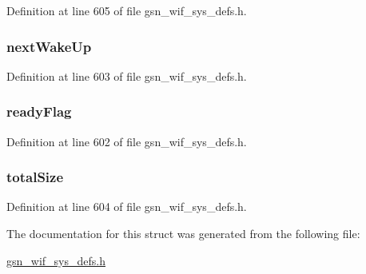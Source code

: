 Definition at line 605 of file gsn\_\-wif\_\-sys\_\-defs.h.

\hypertarget{a00363_a760a4ce0d264283e270a3dec2c784fd9}{
\subsubsection[{nextWakeUp}]{ {\bf nextWakeUp}}}
\label{a00363_a760a4ce0d264283e270a3dec2c784fd9}


Definition at line 603 of file gsn\_\-wif\_\-sys\_\-defs.h.

\hypertarget{a00363_a124b70eb42eacdeecd82e36e46b93d59}{
\subsubsection[{readyFlag}]{ {\bf readyFlag}}}
\label{a00363_a124b70eb42eacdeecd82e36e46b93d59}


Definition at line 602 of file gsn\_\-wif\_\-sys\_\-defs.h.

\hypertarget{a00363_a525677d0cc8dc888ce314ff840778c74}{
\subsubsection[{totalSize}]{ {\bf totalSize}}}
\label{a00363_a525677d0cc8dc888ce314ff840778c74}


Definition at line 604 of file gsn\_\-wif\_\-sys\_\-defs.h.



The documentation for this struct was generated from the following file:\begin{DoxyCompactItemize}
\item 
\hyperlink{a00612}{gsn\_\-wif\_\-sys\_\-defs.h}\end{DoxyCompactItemize}
